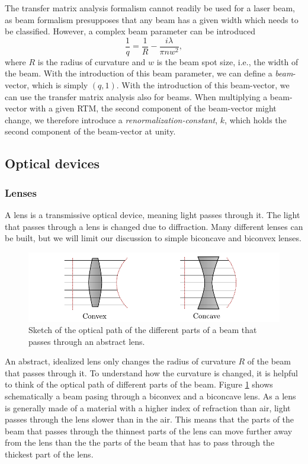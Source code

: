 \documentclass[a4paper, 11pt, notitlepage, english]{article}
\begin{document}
The transfer matrix analysis formalism cannot readily be used for a laser beam, as beam formalism presupposes that any beam has a given width which needs to be classified. However, a complex beam parameter can be introduced
$$\frac{1}{q} = \frac{1}{R} - \frac{i\lambda}{\pi n w^2},$$
where $R$ is the radius of curvature and $w$ is the beam spot size, i.e., the width of the beam. With the introduction of this beam parameter, we can define a \emph{beam}-vector, which is simply $(q,1)$. With the introduction of this beam-vector, we can use the transfer matrix analysis also for beams. When multiplying a beam-vector with a given RTM, the second component of the beam-vector might change, we therefore introduce a \emph{renormalization-constant}, $k$, which holds the second component of the beam-vector at unity.

\subsection{Optical devices}

\subsubsection{Lenses}

A lens is a transmissive optical device, meaning light passes through it. The light that passes through a lens is changed due to diffraction. Many different lenses can be built, but we will limit our discussion to simple biconcave and biconvex lenses.

\begin{figure}[htpb]
\includegraphics[width=\textwidth]{lenses.pdf}	
\caption{Sketch of the optical path of the different parts of a beam that passes through an abstract lens. \label{fig:lenses}}
\end{figure}

An abstract, idealized lens only changes the radius of curvature $R$ of the beam that passes through it. To understand how the curvature is changed, it is helpful to think of the optical path of different parts of the beam. Figure \ref{fig:lenses} shows schematically a beam pasing through a biconvex and a biconcave lens. As a lens is generally made of a material with a higher index of refraction than air, light passes through the lens slower than in the air. This means that the parts of the beam that passes through the thinnest parts of the lens can move further away from the lens than the the parts of the beam that has to pass through the thickest part of the lens. 
\end{document}
